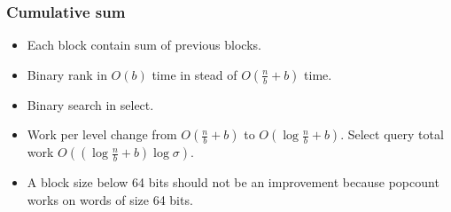 \documentclass{beamer}
\begin{document}

%

\begin{frame}
\frametitle{Cumulative sum}
\begin{itemize}
\item Each block contain sum of previous blocks.
\item Binary rank in $O(b)$ time in stead of $O(\frac{n}{b} + b)$ time.
\item Binary search in select.
\item Work per level change from $O(\frac{n}{b} + b)$ to $O(\log \frac{n}{b} + b)$. Select query total work $O((\log \frac{n}{b} + b) \log \sigma)$.
\item A block size below 64 bits should not be an improvement because popcount works on words of size 64 bits.
\end{itemize}
\end{frame}
\end{document}
